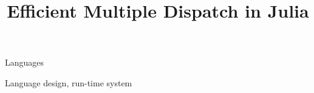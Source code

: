 \documentclass[9pt,cm,preprint]{sigplanconf}
\begin{document}


\title{Efficient Multiple Dispatch in Julia}

\authorinfo{}{}{}

\maketitle




\terms Languages

\keywords
Language design, run-time system

%
%
%
%
%
%






\end{document}
